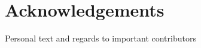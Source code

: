 \thispagestyle{empty}
\raggedright

\section*{Acknowledgements}
Personal text and regards to important contributors

\pagebreak
